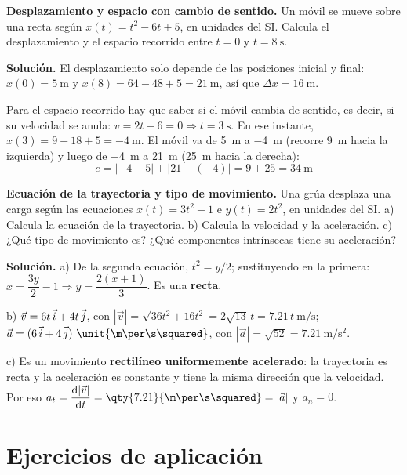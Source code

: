 \begin{example}
    \textbf{Desplazamiento y espacio con cambio de sentido.} Un móvil se mueve sobre una recta según \(x(t) = t^2 - 6t + 5\), en
    unidades del SI. Calcula el desplazamiento y el espacio recorrido entre \(t = 0\) y \(t = \qty{8}{\s}\).

    \textbf{Solución.} El desplazamiento solo depende de las posiciones inicial y final: \(x(0) = \qty{5}{\m}\) y
    \(x(8) = 64 - 48 + 5 = \qty{21}{\m}\), así que \(\Delta x = \qty{16}{\m}\).

    Para el espacio recorrido hay que saber si el móvil cambia de sentido, es decir, si su velocidad se anula:
    \(v = 2t - 6 = 0 \Rightarrow t = \qty{3}{\s}\). En ese instante, \(x(3) = 9 - 18 + 5 = \qty{-4}{\m}\). El móvil va de
    \qty{5}{\m} a \qty{-4}{\m} (recorre \qty{9}{\m} hacia la izquierda) y luego de \qty{-4}{\m} a \qty{21}{\m} (\qty{25}{\m} hacia
    la derecha):
    \[ e = |{-4} - 5| + |21 - (-4)| = 9 + 25 = \qty{34}{\m} \]
\end{example}

\begin{example}
    \textbf{Ecuación de la trayectoria y tipo de movimiento.} Una grúa desplaza una carga según las ecuaciones \(x(t) = 3t^2 - 1\)
    e \(y(t) = 2t^2\), en unidades del SI. a) Calcula la ecuación de la trayectoria. b) Calcula la velocidad y la aceleración.
    c) ¿Qué tipo de movimiento es? ¿Qué componentes intrínsecas tiene su aceleración?

    \textbf{Solución.} a) De la segunda ecuación, \(t^2 = y/2\); sustituyendo en la primera:
    \(x = \dfrac{3y}{2} - 1 \Rightarrow y = \dfrac{2(x + 1)}{3}\). Es una \textbf{recta}.

    b) \(\vec v = 6t\,\vec{i} + 4t\,\vec{j}\), con \(|\vec v| = \sqrt{36t^2 + 16t^2} = 2\sqrt{13}\,t = \num{7.21}\,t~\unit{\m\per\s}\);
    \(\vec a = (6\,\ivec + 4\,\jvec)~\unit{\m\per\s\squared}\), con \(|\vec a| = \sqrt{52} = \qty{7.21}{\m\per\s\squared}\).

    c) Es un movimiento \textbf{rectilíneo uniformemente acelerado}: la trayectoria es recta y la aceleración es constante y
    tiene la misma dirección que la velocidad. Por eso \(a_t = \dfrac{\dif|\vec v|}{\dif t} = \qty{7.21}{\m\per\s\squared} = |\vec a|\)
    y \(a_n = 0\).
\end{example}

\section{Ejercicios de aplicación}\label{sec:ud8-aplicacion}

